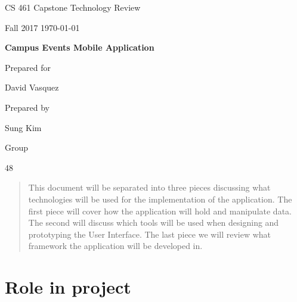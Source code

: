 \documentclass[onecolumn, draftclsnofoot,10pt, compsoc]{IEEEtran}
\def \CapstoneTeamNumber{		48}
\def \GroupMemberOne{			Sung Kim}
\def \CapstoneProjectName{		Campus Events Mobile Application}
\def \CapstoneSponsorPerson{		David Vasquez}
\def \DocType{		Technology Review
				}
\newcommand{\NameSigPair}[1]{\par
\makebox[2.75in][r]{#1} \hfil 	\makebox[3.25in]{\makebox[2.25in]{\hrulefill} \hfill		\makebox[.75in]{\hrulefill}}
\par\vspace{-12pt} \textit{\tiny\noindent
\makebox[2.75in]{} \hfil		\makebox[3.25in]{\makebox[2.25in][r]{Signature} \hfill	\makebox[.75in][r]{Date}}}}
\renewcommand{\NameSigPair}[1]{#1}
\begin{document}
\begin{titlepage}
    \begin{singlespace}
        \hfill 
        \par\vspace{.2in}
        \centering
        \scshape{
            \huge CS 461 Capstone \DocType \par
            \large Fall 2017
            \vspace{.5in}
            {\large\today}\par
            \vspace{.5in}
            \textbf{\Huge\CapstoneProjectName}\par
            \vfill
            {\large Prepared for}\par
            \vspace{5pt}
            {\Large\NameSigPair{\CapstoneSponsorPerson}\par}
            \vspace{5pt}
            {\large Prepared by }\par
            \vspace{5pt}
            {\Large\NameSigPair{\GroupMemberOne}\par}
            {\large Group  }
            {\Large\NameSigPair{\CapstoneTeamNumber}\par}
            \vspace{5pt}


            \vspace{20pt}
        }
        \begin{abstract}
        This document will be separated into three pieces discussing what technologies will be used for the implementation of the application. The first piece will cover how the application will hold and manipulate data. The second will discuss which tools will be used when designing and prototyping the User Interface. The last piece we will review what framework the application will be developed in.
        \end{abstract}     
    \end{singlespace}
\end{titlepage}
\newpage
{}
\tableofcontents
\clearpage

\section{Role in project}
\end{document}
